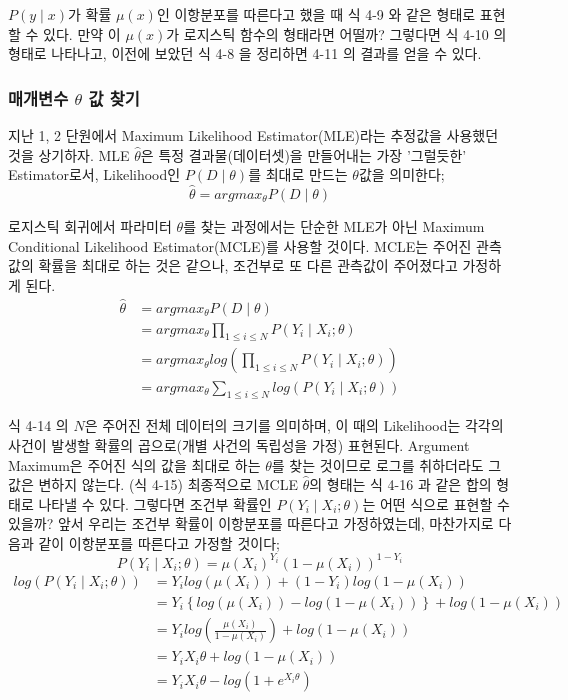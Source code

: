 \documentclass[a4paper]{oblivoir}
\begin{document}
\indent $P(y \mid x)$가 확률 $\mu (x)$인 이항분포를 따른다고 했을 때 식 4-9 와 같은 형태로 표현할 수 있다. 만약 이 $\mu (x)$가 로지스틱 함수의 형태라면 어떨까? 그렇다면 식 4-10 의 형태로 나타나고, 이전에 보았던 식 4-8 을 정리하면 4-11 의 결과를 얻을 수 있다.

\subsubsection{매개변수 \texorpdfstring{$\theta$}{Lg} 값 찾기}
지난 1, 2 단원에서 Maximum Likelihood Estimator(MLE)라는 추정값을 사용했던 것을 상기하자. MLE $\hat{\theta}$은 특정 결과물(데이터셋)을 만들어내는 가장 '그럴듯한' Estimator로서, Likelihood인 $P(D \mid \theta)$를 최대로 만드는 $\theta$값을 의미한다;
\begin{equation*}\hat{\theta} = argmax_{\theta}P(D \mid \theta) \tag{4-12} \end{equation*}

\indent 로지스틱 회귀에서 파라미터 $\theta$를 찾는 과정에서는 단순한 MLE가 아닌 Maximum Conditional Likelihood Estimator(MCLE)를 사용할 것이다. MCLE는 주어진 관측값의 확률을 최대로 하는 것은 같으나, 조건부로 또 다른 관측값이 주어졌다고 가정하게 된다.
\begin{align*}
\hat{\theta} 	&=argmax_{\theta}P(D \mid \theta)												\tag{4-13}\\
			&=argmax_{\theta}\prod_{1\le i\le N}P(Y_{i} \mid X_{i};\theta)					\tag{4-14}\\
			&=argmax_{\theta}log\left(\prod_{1\le i\le N}P(Y_{i} \mid X_{i};\theta)\right)		\tag{4-15}\\
			&=argmax_{\theta}\sum_{1\le i\le N}log(P(Y_{i} \mid X_{i};\theta))				\tag{4-16}
\end{align*}

\indent 식 4-14 의 $N$은 주어진 전체 데이터의 크기를 의미하며, 이 때의 Likelihood는 각각의 사건이 발생할 확률의 곱으로(개별 사건의 독립성을 가정) 표현된다. Argument Maximum은 주어진 식의 값을 최대로 하는 $\theta$를 찾는 것이므로 로그를 취하더라도 그 값은 변하지 않는다. (식 4-15) 최종적으로 MCLE $\hat{\theta}$의 형태는 식 4-16 과 같은 합의 형태로 나타낼 수 있다. 그렇다면 조건부 확률인 $P(Y_{i} \mid X_{i};\theta)$는 어떤 식으로 표현할 수 있을까? 앞서 우리는 조건부 확률이 이항분포를 따른다고 가정하였는데, 마찬가지로 다음과 같이 이항분포를 따른다고 가정할 것이다;
\begin{equation*}P(Y_{i} \mid X_{i};\theta) = \mu(X_{i})^{Y_{i}}(1-\mu(X_{i}))^{1-Y_{i}}\tag{4-17} \end{equation*}
\begin{align*}
log(P(Y_{i} \mid X_{i};\theta))	&=Y_{i}log(\mu(X_{i}))+(1-Y_{i})log(1-\mu(X_{i}))	\tag{4-18}\\
	&=Y_{i}\left\{log(\mu(X_{i}))-log(1-\mu(X_{i}))\right\}+log(1-\mu(X_{i}))			\tag{4-19}\\
	&=Y_{i}log\left(\frac{\mu(X_{i})}{1-\mu(X_{i})}\right)+log(1-\mu(X_{i}))			\tag{4-20}\\
	&=Y_{i}X_{i}\theta+log(1-\mu(X_{i}))											\tag{4-21}\\
	&=Y_{i}X_{i}\theta-log(1+e^{X_{i}\theta})										\tag{4-22}
\end{align*}
\end{document}
